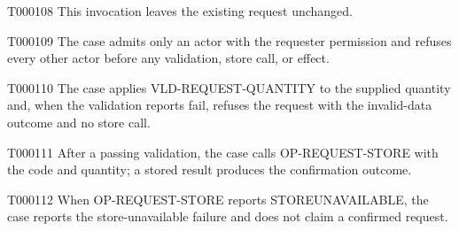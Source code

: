 \documentclass[11pt,a4paper]{article}
\begin{document}
\begin{atlasparagraph}{T000108}
This invocation leaves the existing request unchanged.
\end{atlasparagraph}
\begin{atlasparagraph}{T000109}
The case admits only an actor with the requester permission and refuses every other actor before any validation, store call, or effect.
\end{atlasparagraph}
\begin{atlasparagraph}{T000110}
The case applies VLD-REQUEST-QUANTITY to the supplied quantity and, when the validation reports fail, refuses the request with the invalid-data outcome and no store call.
\end{atlasparagraph}
\begin{atlasparagraph}{T000111}
After a passing validation, the case calls OP-REQUEST-STORE with the code and quantity; a stored result produces the confirmation outcome.
\end{atlasparagraph}
\begin{atlasparagraph}{T000112}
When OP-REQUEST-STORE reports STORE\AtlasCharUnderscore{}UNAVAILABLE, the case reports the store-unavailable failure and does not claim a confirmed request.
\end{atlasparagraph}
\end{document}
